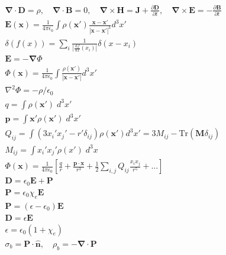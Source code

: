 \documentclass[10pt]{article}
\newcommand{\nhat}{\boldsymbol{\hat{\textbf{n}}}}
\newcommand{\ve}[1]{\boldsymbol{\mathbf{#1}}}
\newcommand{\vect}[1]{\boldsymbol{\mathbf{#1}}}
\newcommand{\vc}[1]{\mathbf{#1}}
\newcommand{\dd}{\, \mathrm{d}}
\newcommand{\eo}{\epsilon_0}
\newcommand{\tder}[2]{\frac{\dd #1}{\dd #2}}
\newcommand{\pder}[2]{\frac{\partial #1}{\partial #2}}
\newcommand{\K}{\frac{1}{4 \pi \eo}}
\begin{document}
\begin{multicols}{2}
	\tiny
	\setlength{\abovedisplayskip}{-25pt}
	\setlength{\belowdisplayskip}{0pt}
	\setlength{\abovedisplayshortskip}{0pt}
	\begin{align*}
		& \ve{\nabla \cdot D} = \rho, \quad \ve{\nabla \cdot B} = 0, \quad \ve{\nabla \times H} = \ve{J}+\pder{\ve{D}}{t},\quad \ve{\nabla \times E} = - \pder{\ve{B}}{t} \tag*{Maxwell's Equations (6.6)}\\
		& \vect{E}(\vect{x}) = \frac{1}{4 \pi \eo} \int \rho(\vect{x}') \frac{\vect{x} - \vect{x}'}{|\vect{x} - \vect{x}'|^3} d^3x' \tag*{Coulomb's Law (1.5)} \\
		& \delta(f(x)) = \sum_{i} \frac{1}{\left|\tder{f}{x}(x_i)\right|}\delta(x - x_i)	\tag*{Delta function Rule 5 } \\
		& \vc{E} = -\vc{\nabla} \Phi	\tag*{Electric field in terms of scalar potential (1.16)} \\
		& \Phi(\vc{x}) = \K \int \frac{\rho (\vc{x}')}{|\vc{x} - \vc{x}'|} d^3 x' \tag*{Scalar potential in terms of charge density (1.17)} \\
		& \nabla^2 \Phi = -\rho/\eo	\tag*{Poisson Equation (1.28)} \\
		& q = \int \rho(\vect{x}') \; d^3x'	\tag*{Monopole (4.4)} \\
		& \vect{p} = \int \vect{x}' \rho(\vect{x}') \; d^3x'	\tag*{Dipole (4.8)} \\
		& Q_{ij} = \int (3 x_i' x_j'- r' \delta_{ij})\rho(\vect{x}') d^3x' = 3 M_{ij} - \text{Tr}(\vect{M} \delta_{ij})		\tag*{Quadrupole (4.9)} \\
		& M_{ij} = \int x_i' x_j' \rho(x') \; d^3 x \tag*{Dana definition} \\
		&\Phi(\vect{x}) = \K \left[ \frac{q}{r} + \frac{ \vect{p} \cdot \vect{x}}{r^3} + \frac{1}{2} \sum_{i,j} Q_{ij} \frac{x_i x_j}{r^5} + ... \right] \tag*{Multipole Expansion (4.10)} \\
		& \vect{D} = \eo \vect{E} + \vect{P} \tag*{Electric displacement(4.34)} \\
		& \vect{P} = \eo \chi_e \vect{E} \tag*{Induced polarization (4.36)} \\
		& \ve{P} = (\epsilon - \eo) \ve{E} \tag*{Better expression for polarization} \\
		& \vect{D} = \epsilon \vect{E} \tag*{Electric displacement (4.37)} \\
		& \epsilon = \eo (1 + \chi_e) \tag*{Electric permittivity (4.38)} \\
		& \sigma_b = \ve{P} \cdot \nhat, \quad \rho_b = - \ve{\nabla \cdot P} \tag*{Electric bound charge density (G. 4.11)} \\

\end{align*}
\end{multicols}
\end{document}
